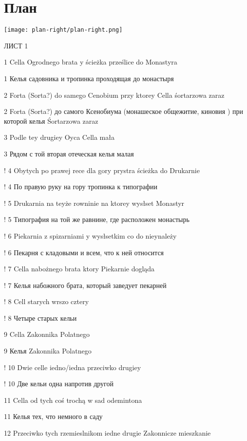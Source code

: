 \chapter{План }

\newpage


\begin{center}
\texttt{[image: plan-right/plan-right.png]}
\end{center}

\newpage

ЛИСТ 1

1 Cella Ogrodnego brata y ścieżka prześlice do 
Monastyra

1 Келья садовника и тропинка проходящая до монастыря

2 Forta (Sorta?) do samego Cenobium przy ktorey Cella śortarzowa zaraz

2 Forta (Sorta?)  до самого Ксенобиума (монашеское общежитие, киновия ) при которой келья Śortarzowa zaraz

3 Podle tey drugiey Oyca Cella mała

3 Рядом с той вторая отеческая келья малая 

! 4 Obytych po prawej rece dla gory prystra ścieżka do Drukarnie

! 4 По правую руку на гору тропинка к типографии

! 5 Drukarnia na teyże rowninie na ktorey wysłset Monastyr

! 5 Типография на той же равнине, где расположен монастырь

! 6 Piekarnia z spizarniami y wysłsetkim co do nieynależy

! 6 Пекарня с кладовыми и всем, что к ней относится 

! 7 Cella nabożnego brata ktory Piekarnie dogląda

! 7 Келья набожного брата, который заведует пекарней

! 8 Cell starych wrszo cztery

! 8 Четыре старых кельи

9 Cella Zakonnika Polatnego

9 Келья Zakonnika Polatnego 

! 10 Dwie celle iedno/iedna przeciwko drugiey

! 10 Две кельи одна напротив другой

11 Cella od tych coś trochą w sad odemintona

11 Келья тех, что немного в саду

12 Przeciwko tych rzemieslnikom iedne drugie Zakonnicze mieszkanie

